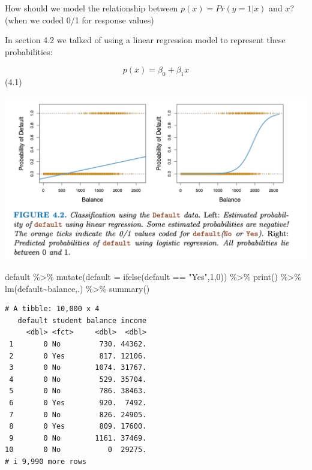 \documentclass[
  letterpaper,
  DIV=11,
  numbers=noendperiod]{scrreprt}
\newenvironment{Shaded}{\begin{snugshade}}{\end{snugshade}}
\newcommand{\AttributeTok}[1]{\textcolor[rgb]{0.65,0.35,0.00}{#1}}
\newcommand{\DecValTok}[1]{\textcolor[rgb]{0.47,0.16,0.63}{#1}}
\newcommand{\FunctionTok}[1]{\textcolor[rgb]{0.02,0.16,0.49}{#1}}
\newcommand{\NormalTok}[1]{\textcolor[rgb]{0.33,0.33,0.33}{#1}}
\newcommand{\SpecialCharTok}[1]{\textcolor[rgb]{0.00,0.46,0.62}{#1}}
\newcommand{\StringTok}[1]{\textcolor[rgb]{0.00,0.50,0.00}{#1}}
\begin{document}
How should we model the relationship between \(p(x) = Pr(y = 1| x)\) and
\(x\)? (when we coded 0/1 for response values)

In section 4.2 we talked of using a linear regression model to represent
these probabilities:

\[
p(x) = \beta_0 + \beta_1 x
\] (4.1)

\includegraphics{fig4.2.png}

\begin{Shaded}
\begin{Highlighting}[]
\NormalTok{default }\SpecialCharTok{\%\textgreater{}\%} 
  \FunctionTok{mutate}\NormalTok{(}\AttributeTok{default =} \FunctionTok{ifelse}\NormalTok{(default }\SpecialCharTok{==} \StringTok{"Yes"}\NormalTok{,}\DecValTok{1}\NormalTok{,}\DecValTok{0}\NormalTok{)) }\SpecialCharTok{\%\textgreater{}\%} 
  \FunctionTok{print}\NormalTok{() }\SpecialCharTok{\%\textgreater{}\%} 
  \FunctionTok{lm}\NormalTok{(default}\SpecialCharTok{\textasciitilde{}}\NormalTok{balance,.) }\SpecialCharTok{\%\textgreater{}\%} 
  \FunctionTok{summary}\NormalTok{()}
\end{Highlighting}
\end{Shaded}

\begin{verbatim}
# A tibble: 10,000 x 4
   default student balance income
     <dbl> <fct>     <dbl>  <dbl>
 1       0 No         730. 44362.
 2       0 Yes        817. 12106.
 3       0 No        1074. 31767.
 4       0 No         529. 35704.
 5       0 No         786. 38463.
 6       0 Yes        920.  7492.
 7       0 No         826. 24905.
 8       0 Yes        809. 17600.
 9       0 No        1161. 37469.
10       0 No           0  29275.
# i 9,990 more rows
\end{verbatim}
\end{document}
